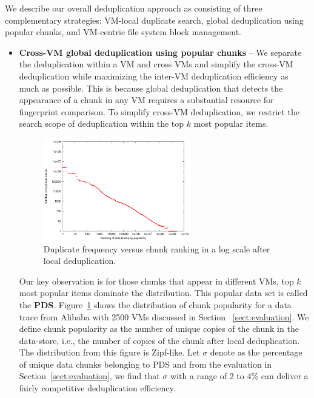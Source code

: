 We describe our overall deduplication approach as consisting of three
complementary strategies: VM-local
duplicate search, global deduplication using popular chunks, and 
VM-centric file system block management. 
\begin{itemize}
\item 
\textbf{Cross-VM global deduplication using popular chunks} --
We separate the deduplication within a VM and cross VMs
and simplify the cross-VM deduplication while maximizing the inter-VM deduplication efficiency  as much as possible.
This is because global deduplication that detects the appearance of a chunk 
in any VM requires a substantial resource for fingerprint comparison.
To simplify cross-VM deduplication, we restrict the search scope of deduplication within the top $k$ most popular items.
 \begin{figure}
 \centering
  \includegraphics[width=2.5in]{figures/zipf_count_rank.pdf}
 \caption{Duplicate frequency versus  chunk ranking in a log scale after local deduplication.}
 \label{fig:Datazipf}
 \end{figure}


Our key observation is for those chunks that appear in different VMs, top $k$ most popular items
dominate the distribution.  This popular data set is called the \textbf{PDS}. 
Figure~\ref{fig:Datazipf} shows the distribution of chunk popularity for a data trace 
from Alibaba with 2500 VMs discussed in Section ~\ref{sect:evaluation}.
We define chunk popularity as the number of unique copies of the chunk in the data-store,
i.e., the number of copies of the chunk after local deduplication.
The distribution from this figure is Zipf-like. 
Let  $\sigma$ denote as the percentage of unique data chunks belonging to PDS and 
from the evaluation in Section~\ref{sect:evaluation}, we find that
$\sigma$ with a range of 2 to 4\% can deliver a fairly competitive deduplication efficiency.


\end{itemize}
